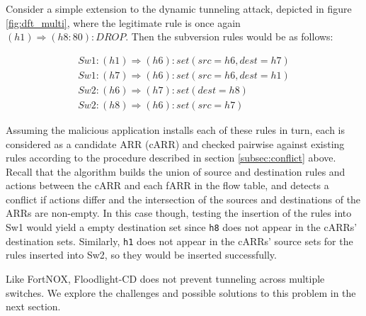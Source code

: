Consider a simple extension to the dynamic tunneling attack, depicted in figure \ref{fig:dft_multi}, where the legitimate rule is once again $(h1) \Rightarrow (h8:80): DROP$. 
Then the subversion rules would be as follows: 

\begin{align}
  Sw1: (h1) \Rightarrow (h6): set(src=h6, dest=h7) \\
  Sw1: (h7) \Rightarrow (h6): set(src=h6, dest=h1) \\
  Sw2: (h6) \Rightarrow (h7): set(dest=h8) \\
  Sw2: (h8) \Rightarrow (h6): set(src=h7)
\end{align}

Assuming the malicious application installs each of these rules in turn, each is considered as a candidate ARR (cARR) and checked pairwise against existing rules according to the procedure described in section \ref{subsec:conflict} above. 
Recall that the algorithm builds the union of source and destination rules and actions between the cARR and each fARR in the flow table, and detects a conflict if actions differ and the intersection of the sources and destinations of the ARRs are non-empty. 
In this case though, testing the insertion of the rules into Sw1 would yield a empty destination set since \texttt{h8} does not appear in the cARRs' destination sets. 
Similarly, \texttt{h1} does not appear in the cARRs' source sets for the rules inserted into Sw2, so they would be inserted successfully. 

Like FortNOX, Floodlight-CD does not prevent tunneling across multiple switches.
We explore the challenges and possible solutions to this problem in the next section.



